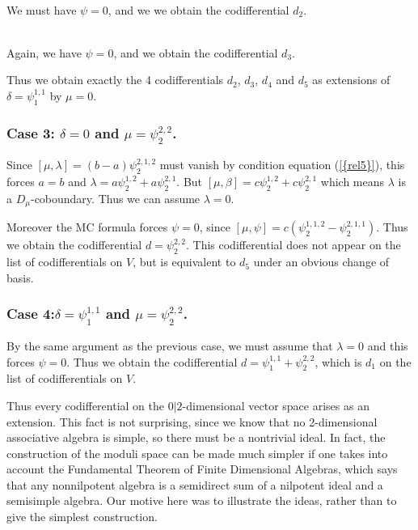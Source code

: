 \documentclass[12pt]{amsart}
\theoremstyle{definition}
\begin{document}
\\ We must have
$\psi=0$, and we we obtain the codifferential $d_2$.

\\ Again, we have
$\psi=0$, and we obtain the codifferential $d_3$.

Thus we obtain exactly the 4 codifferentials $d_2$, $d_3$, $d_4$ and
$d_5$ as extensions of $\delta={\psi^{{1,1}}_{1}}$ by $\mu=0$.
\subsubsection{Case 3: $\delta=0$ and $\mu={\psi^{{2,2}}_{2}}$.}
Since $[\mu,\lambda]=(b-a){\psi^{{2,1,2}}_{2}}$ must vanish by condition
{equation (\ref{{rel5}})}, this forces $a=b$ and
$\lambda=a{\psi^{{1,2}}_{2}}+a{\psi^{{2,1}}_{2}}$. But
$[\mu,\beta]=c{\psi^{{1,2}}_{2}}+c{\psi^{{2,1}}_{2}}$ which means $\lambda$ is a
$D_\mu$-coboundary. Thus we can assume $\lambda=0$.

Moreover the MC formula forces $\psi=0$, since
$[\mu,\psi]=c({\psi^{{1,1,2}}_{2}}-{\psi^{{2,1,1}}_{2}})$. Thus we obtain the
codifferential $d={\psi^{{2,2}}_{2}}$.  This codifferential does not appear
on the list of codifferentials on $V$, but is equivalent to $d_5$
under an obvious change of basis.
\subsubsection{Case 4:$\delta={\psi^{{1,1}}_{1}}$ and $\mu={\psi^{{2,2}}_{2}}$.}
By the same argument as the previous case, we must assume that
$\lambda=0$ and this forces $\psi=0$. Thus we obtain the
codifferential $d={\psi^{{1,1}}_{1}}+{\psi^{{2,2}}_{2}}$, which is $d_1$ on the list
of codifferentials on $V$.

Thus  every codifferential on the $0|2$-dimensional vector space arises as an extension.
This fact is not surprising, since we know that no 2-dimensional associative algebra is simple,
so there must be a nontrivial ideal. In fact, the construction of the moduli space
can be made much simpler if one takes into account the Fundamental Theorem of
Finite Dimensional Algebras, which says that any nonnilpotent algebra is a semidirect
sum of a nilpotent ideal and a semisimple algebra. Our motive here was to illustrate
the ideas, rather than to give the simplest construction.
\end{document}
